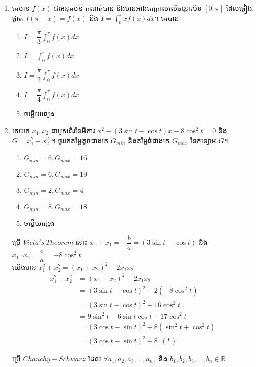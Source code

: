 \documentclass[a4paper,12pt]{article}
\begin{document}
\begin{enumerate}[m]
	{\color{blue}\hrulefill}
	\item គេមាន $f(x)$ ជាអនុគមន៍	កំណត់បាន និងមានអាំងតេក្រាលលើចន្លោះបិទ $\left[0;\pi\right]$ ដែលផ្ទៀងផ្ទាត់ $f\left(\pi-x\right)=f(x)$ និង $I=\int_{0}^{\pi}xf(x)dx$។ គេបាន
	\begin{enumerate}[k,4]
		\item $I=\dfrac{\pi}{3}\int_{0}^{\pi}f(x)dx$
		\item $I=\int_{0}^{\pi}f(x)dx$
		\item $I=\dfrac{\pi}{2}\int_{0}^{\pi}f(x)dx$
		\item $I=\dfrac{\pi}{4}\int_{0}^{\pi}f(x)dx$
		\item ចម្លើយផ្សេង
	\end{enumerate}
	\answer
	{\color{blue}\hrulefill}
	\item គេយក $x_1,x_2$ ជាប្ញសពីរនៃមីការ $x^2-\left(3\sin t-\cos t\right)x-8\cos^2t=0$ និង $G=x_1^2+x_2^2$ ។ ចូររកតម្លៃតូចជាងគេ $G_{min}$ និងតម្លៃធំជាងគេ $G_{max}$ នៃកន្សោម $G$។ 
		\begin{enumerate}[k,3]
			\item $G_{min}=6, G_{max}=16$
			\item $G_{min}=6, G_{max}=19$
			\item $G_{min}=2, G_{max}=4$
			\item $G_{min}=8, G_{max}=18$
			\item ចម្លើយផ្សេង
		\end{enumerate}
	\answer
	\begin{center}
		ប្រើ $Vieta's~Theorem$ នោះ $x_1+x_1=-\dfrac{b}{a}=\left(3\sin t-\cos t\right)$ \kb និង $x_1\cdot x_2=\dfrac{c}{a}=-8\cos^2t$ \\
		យើងមាន $x_1^2+x_2^2=\left(x_1+x_2\right)^2-2x_1 x_2$\\
		\begin{align*}
		x_1^2+x_2^2&=\left(x_1+x_2\right)^2-2x_1 x_2\\
		&=\left(3\sin t-\cos t\right)^2-2\left(-8\cos^2t\right)\\
		&=\left(3\sin t-\cos t\right)^2+16\cos^2t\\
		&=9\sin^2t-6\sin t\cos t +17\cos^2t\\
		&=\left(3\cos t-\sin t\right)^2 +8\left(\sin^2t+\cos^2t\right)\\
		&=\left(3\cos t-\sin t\right)^2 +8~~ (*)
		\end{align*}
		\begin{center}
			ប្រើ $Chauchy-Schwarz$ ដែល $\forall a_1,a_2, a_3,\dots,a_n,$ និង $b_1, b_2, b_3,\dots,b_n \in\mathbb{R}$\\

\end{center}
\end{center}
\end{enumerate}
\end{document}
